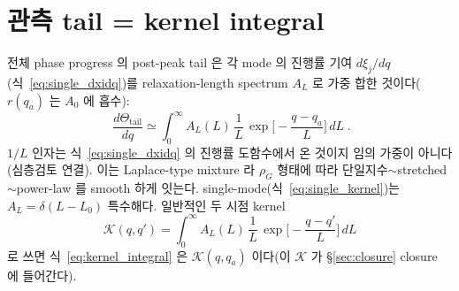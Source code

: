 \section{관측 tail = kernel integral}\label{sec:kernel}
전체 phase progress 의 post-peak tail 은 각 mode 의 진행률 기여 $d\xi_j/dq$(식~\eqref{eq:single_dxidq})를
relaxation-length spectrum $A_L$ 로 가중 합한 것이다($r(q_a)$ 는 $A_0$ 에 흡수):
\begin{equation}
\boxed{\;\frac{d\Theta_\mathrm{tail}}{dq}\simeq\int_0^\infty A_L(L)\,\frac1L\,
\exp\!\Big[-\frac{q-q_a}{L}\Big]\,dL\;.}
\label{eq:kernel_integral}
\end{equation}
$1/L$ 인자는 식~\eqref{eq:single_dxidq} 의 진행률 도함수에서 온 것이지 임의 가중이 아니다(심층검토 연결).
이는 Laplace-type mixture 라 $\rho_G$ 형태에 따라 단일지수$\sim$stretched$\sim$power-law 를 smooth 하게
잇는다. single-mode(식~\eqref{eq:single_kernel})는 $A_L=\delta(L-L_0)$ 특수해다. 일반적인 두 시점 kernel
\begin{equation}
\mathcal K(q,q')=\int_0^\infty A_L(L)\,\frac1L\,\exp\!\Big[-\frac{q-q'}{L}\Big]\,dL
\label{eq:Kdef}
\end{equation}
로 쓰면 식~\eqref{eq:kernel_integral} 은 $\mathcal K(q,q_a)$ 이다(이 $\mathcal K$ 가 \S\ref{sec:closure} closure 에 들어간다).

